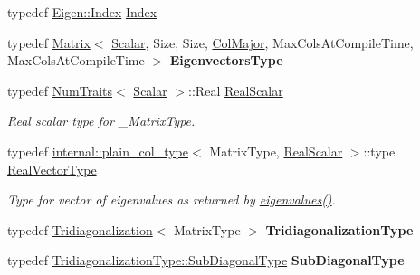 \begin{DoxyCompactItemize}
typedef \hyperlink{namespace_eigen_a62e77e0933482dafde8fe197d9a2cfde}{Eigen\+::\+Index} \hyperlink{group___eigenvalues___module_a8a59ab7734b6eae2754fd78bc7c3a360}{Index}
\item 
\mbox{\label{group___eigenvalues___module_a0cbb16dc8baf4058188ea308fa37a803}} 
typedef \hyperlink{group___core___module_class_eigen_1_1_matrix}{Matrix}$<$ \hyperlink{group___eigenvalues___module_a0bfcedf4245b6846007ca4f01e4feb1f}{Scalar}, Size, Size, \hyperlink{group__enums_ggaacded1a18ae58b0f554751f6cdf9eb13a0cbd4bdd0abcfc0224c5fcb5e4f6669a}{Col\+Major}, Max\+Cols\+At\+Compile\+Time, Max\+Cols\+At\+Compile\+Time $>$ {\bfseries Eigenvectors\+Type}
\item 
typedef \hyperlink{group___core___module_struct_eigen_1_1_num_traits}{Num\+Traits}$<$ \hyperlink{group___eigenvalues___module_a0bfcedf4245b6846007ca4f01e4feb1f}{Scalar} $>$\+::Real \hyperlink{group___eigenvalues___module_a5dae5f422a3c71060e6bd31332bf64fd}{Real\+Scalar}
\begin{DoxyCompactList}\small\item\em Real scalar type for {\ttfamily \+\_\+\+Matrix\+Type}. \end{DoxyCompactList}\item 
typedef \hyperlink{struct_eigen_1_1internal_1_1plain__col__type}{internal\+::plain\+\_\+col\+\_\+type}$<$ Matrix\+Type, \hyperlink{group___eigenvalues___module_a5dae5f422a3c71060e6bd31332bf64fd}{Real\+Scalar} $>$\+::type \hyperlink{group___eigenvalues___module_acd090d5fdfc3cc017a13b6d8daa92287}{Real\+Vector\+Type}
\begin{DoxyCompactList}\small\item\em Type for vector of eigenvalues as returned by \hyperlink{group___eigenvalues___module_a8efab27e82aa6aa0ae0c64739238c2e0}{eigenvalues()}. \end{DoxyCompactList}\item 
\mbox{\label{group___eigenvalues___module_aee7b34cdccc189fa836c20f55f8415dd}} 
typedef \hyperlink{group___eigenvalues___module_class_eigen_1_1_tridiagonalization}{Tridiagonalization}$<$ Matrix\+Type $>$ {\bfseries Tridiagonalization\+Type}
\item 
\mbox{\label{group___eigenvalues___module_aeef7348fa4e1c14b469fd26d17f7713e}} 
typedef \hyperlink{group___core___module_class_eigen_1_1_matrix}{Tridiagonalization\+Type\+::\+Sub\+Diagonal\+Type} {\bfseries Sub\+Diagonal\+Type}
\end{DoxyCompactItemize}
